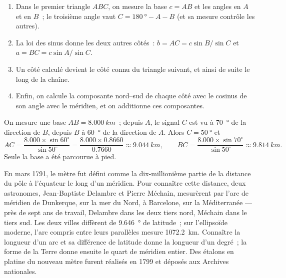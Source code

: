 \begin{method}\label{met:g10:measuring-the-earth:chain}
\begin{enumerate}
  \item Dans le premier triangle $ABC$, on mesure la base $c = AB$ et les
        angles en $A$ et en $B$~; le troisième angle vaut
        $C = \qty{180}{\degree} - A - B$ (et sa mesure contrôle les
        autres).
  \item La loi des sinus donne les deux autres côtés~:
        $b = AC = c \sin B / \sin C$ et $a = BC = c \sin A / \sin C$.
  \item Un côté calculé devient le côté connu du triangle suivant, et ainsi
        de suite le long de la chaîne.
  \item Enfin, on calcule la composante nord--sud de chaque côté avec le
        cosinus de son angle avec le méridien, et on additionne ces
        composantes.
\end{enumerate}
\end{method}

\begin{example}[Un triangle]\label{ex:g10:measuring-the-earth:triangle}
On mesure une base $AB = \qty{8.000}{km}$~; depuis $A$, le signal $C$ est
vu à \qty{70}{\degree} de la direction de $B$, depuis $B$ à
\qty{60}{\degree} de la direction de $A$. Alors $C = \qty{50}{\degree}$ et
\[
  AC = \frac{8.000 \times \sin 60^\circ}{\sin 50^\circ} = \frac{8.000 \times 0.8660}{0.7660}
  \approx \qty{9.044}{km}, \qquad
  BC = \frac{8.000 \times \sin 70^\circ}{\sin 50^\circ} \approx \qty{9.814}{km}.
\]
Seule la base a été parcourue à pied.
\end{example}

\begin{example}\label{ex:g10:measuring-the-earth:meridian}
En mars 1791, le mètre fut défini comme la dix-millionième partie de la
distance du pôle à l'équateur le long d'un méridien. Pour connaître cette
distance, deux astronomes, Jean-Baptiste Delambre et Pierre Méchain,
mesurèrent par  l'arc de méridien de Dunkerque, sur la mer du
Nord, à Barcelone, sur la Méditerranée --- près de sept ans de travail,
Delambre dans les deux tiers nord, Méchain dans le tiers sud. Les deux
villes diffèrent de \qty{9.646}{\degree} de latitude~; sur l'ellipsoïde
moderne, l'arc compris entre leurs parallèles mesure \qty{1072.2}{km}.
Connaître la longueur d'un arc et sa différence de latitude donne la
longueur d'un degré~; la forme de la Terre donne ensuite le quart de
méridien entier. Des étalons en platine du nouveau mètre furent réalisés en
1799 et déposés aux Archives nationales.
\end{example}

